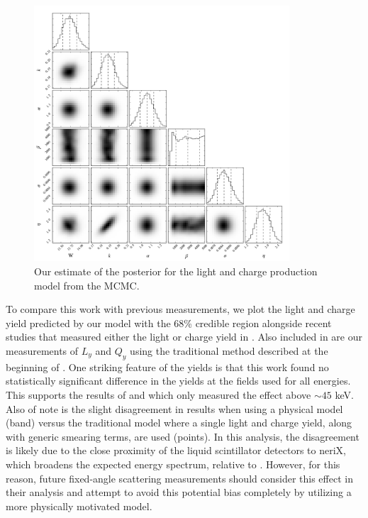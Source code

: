 


\begin{figure}[t]
        \centering
	\includegraphics[width=0.85\textwidth]{corner_plot_physical_pars}
	\caption{Our estimate of the posterior for the light and charge production model from the MCMC.}
	\label{fig:nerix_physical_corner}
\end{figure}


To compare this work with previous measurements, we plot the light and charge yield predicted by our model with the 68\% credible region alongside recent studies that measured either the light or charge yield in .  Also included in  are our measurements of $L_y$ and $Q_y$ using the traditional method described at the beginning of .   One striking feature of the yields is that this work found no statistically significant difference in the yields at the fields used for all energies.  This supports the results of  and  which only measured the effect above $\sim 45$ keV.  Also of note is the slight disagreement in results when using a physical model (band) versus the traditional model where a single light and charge yield, along with generic smearing terms, are used  (points).   In this analysis, the disagreement is likely due to the close proximity of the liquid scintillator detectors to neriX, which broadens the expected energy spectrum, relative to .  However, for this reason, future fixed-angle scattering measurements should consider this effect in their analysis and attempt to avoid this potential bias completely by utilizing a more physically motivated model.



